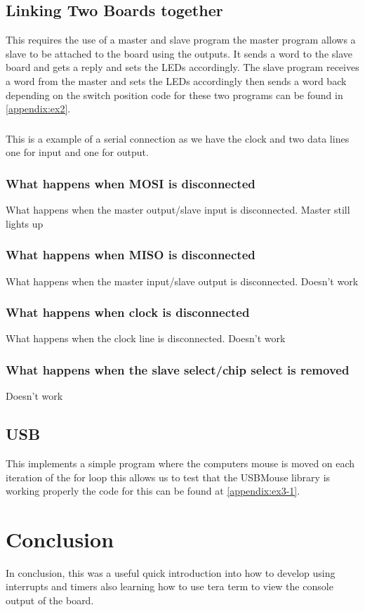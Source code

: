 \documentclass[a4paper,12pt]{scrartcl}
\begin{document}
{		\subsection{Linking Two Boards together}
		{
			This requires the use of a master and slave program the master program allows a slave to be attached to the board using the outputs. It sends a word to the slave board and gets a reply and sets the LEDs accordingly. The slave program receives a word from the master and sets the LEDs accordingly then sends a word back depending on the switch position code for these two programs can be found in \cref{appendix:ex2}.
			\subsubsection{}{
				This is a example of a serial connection as we have the clock and two data lines one for input and one for output.
			}
			\subsubsection{What happens when MOSI is disconnected}
			{
				What happens when the master output/slave input is disconnected. Master still lights up
			}
			\subsubsection{What happens when MISO is disconnected}
			{
				What happens when the master input/slave output is disconnected. Doesn't work
			}
			\subsubsection{What happens when clock is disconnected}
			{
				What happens when the clock line is disconnected. Doesn't work
			}
			\subsubsection{What happens when the slave select/chip select is removed}
			{
				Doesn't work
			}
		}
		\subsection{USB}
		{
			This implements a simple program where the computers mouse is moved on each iteration of the for loop this allows us to test that the USBMouse library is working properly the code for this can be found at \cref{appendix:ex3-1}.
		}
	}

	\section{Conclusion}
	{
		In conclusion, this was a useful quick introduction into how to develop using interrupts and timers also learning how to use tera term to view the console output of the board.
	}
	
	\newpage
	
	\printbibliography[heading=bibintoc,title=References]
\end{document}
